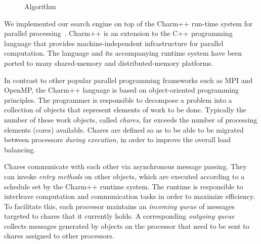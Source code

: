 \documentclass[times, 10pt,twocolumn]{article}
\begin{document}
\begin{figure}[htpb]
\small
\begin{boxedminipage}{\columnwidth}
\begin{algorithmic}[1]
  \EndIf
\EndFunction
\label{codelisting}
\end{algorithmic}
\end{boxedminipage}
\caption{Algorithm}
\end{figure}

\label{ParSSSE}
We implemented our search engine on top of the {\sc Charm++} run-time
system for parallel processing~\cite{kale93charm,kale09charm}.  {\sc Charm++}
is an extension to the C++ programming language that provides
machine-independent infrastructure for parallel computation.  The language and
its accompanying runtime system have been ported to many shared-memory and
distributed-memory platforms.

In contrast to other popular parallel programming frameworks such as {\sc MPI}
and {\sc OpenMP}, the {\sc Charm++} language is based on object-oriented
programming principles.  The programmer is responsible to decompose a problem
into a collection of objects that represent elements of work to be done.
Typically the number of these work objects, called {\em chares}, far exceeds
the number of processing elements (cores) available.  Chares are defined
so as to be able to be migrated between processors {\em during execution}, in
order to improve the overall load balancing.  

Chares communicate with each other via
asynchronous message passing.  They can invoke {\em entry methods} on other
objects, which are executed according to a schedule set by the {\sc Charm++}
runtime system.  The runtime is responsible to interleave computation and
communication tasks in order to maximize efficiency.  To facilitate this, each
processor maintains an {\em incoming queue} of messages targeted to chares that
it currently holds.  A corresponding {\em outgoing queue} collects messages
generated by objects on the processor that need to be sent to chares assigned
to other processors.
\end{document}
